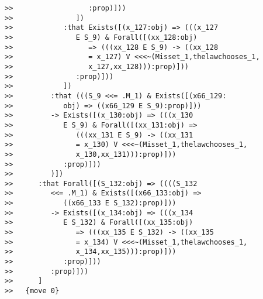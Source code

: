 \documentclass[12pt]{article}
\begin{document}
\begin{verbatim}
>>                  :prop)]))
>>               ])
>>            :that Exists([(x_127:obj) => (((x_127
>>               E S_9) & Forall([(xx_128:obj)
>>                  => (((xx_128 E S_9) -> ((xx_128
>>                  = x_127) V <<<~(Misset_1,thelawchooses_1,
>>                  x_127,xx_128))):prop)]))
>>               :prop)]))
>>            ])
>>         :that (((S_9 <<= .M_1) & Exists([(x66_129:
>>            obj) => ((x66_129 E S_9):prop)]))
>>         -> Exists([(x_130:obj) => (((x_130
>>            E S_9) & Forall([(xx_131:obj) =>
>>               (((xx_131 E S_9) -> ((xx_131
>>               = x_130) V <<<~(Misset_1,thelawchooses_1,
>>               x_130,xx_131))):prop)]))
>>            :prop)]))
>>         )])
>>      :that Forall([(S_132:obj) => ((((S_132
>>         <<= .M_1) & Exists([(x66_133:obj) =>
>>            ((x66_133 E S_132):prop)]))
>>         -> Exists([(x_134:obj) => (((x_134
>>            E S_132) & Forall([(xx_135:obj)
>>               => (((xx_135 E S_132) -> ((xx_135
>>               = x_134) V <<<~(Misset_1,thelawchooses_1,
>>               x_134,xx_135))):prop)]))
>>            :prop)]))
>>         :prop)]))
>>      ]
>>   {move 0}



\end{verbatim}
\end{document}
